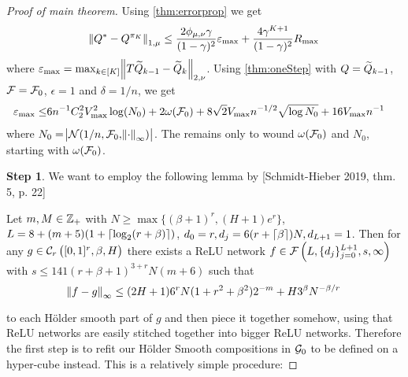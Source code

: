 




\begin{proof}[Proof of main theorem] %
  Using \cref{thm:errorprop} we get
  \begin{equation}
    \norm{Q^* - Q^{\pi_K}}_{1,\mu} \leq
    \frac{2 \phi_{\mu, \nu} \gamma}{(1-\gamma)^2}\varepsilon_{\max} +
    \frac{4 \gamma^{K+1}}{(1-\gamma)^2} R_{\max}
    \label{eq:mp1}
  \end{equation}
  where $\varepsilon_{\max} =
  \max_{k \in [K]} \norm{T \widetilde{Q}_{k-1} - \widetilde{Q}_k}_{2, \nu}$.
  Using \cref{thm:oneStep} with $Q = \widetilde{Q}_{k-1}$,
  $\mathcal{F} = \mathcal{F}_0$, $\epsilon = 1$ and $\delta = 1/n$, we get
  \begin{align}
    \varepsilon_{\max} \leq & 6 n^{-1} C_2^2 V_{\max}^2 \log(N_0)
    + 2 \omega(\mathcal{F}_0)
    + 8 \sqrt{2} V_{\max} n^{-1/2} \sqrt{\log N_0}
    + 16 V_{\max} n^{-1}
    \label{eq:mp2}
  \end{align}
  where $N_0 = \abs{\mathcal{N}(1/n, \mathcal{F}_0, \norm{\cdot}_\infty)}$.
  The remains only to wound $\omega(\mathcal{F}_0)$ and $N_0$,
  starting with $\omega(\mathcal{F}_0)$.

  \textbf{Step 1}. %
  We want to employ the following lemma by [Schmidt-Hieber 2019, thm. 5, p. 22]
  \begin{lem}
    Let $m,M \in \mathbb{Z}_+$ with $N \geq \max\{(\beta + 1)^r, (H + 1) e^r\}$,
    $L = 8 + (m + 5) (1 + \lceil\log_2(r + \beta)\rceil)$, 
    $d_0 = r, d_j = 6(r + \lceil\beta\rceil) N, d_{L+1} = 1$.
    Then for any $g \in \mathcal{C}_r \left( [0,1]^r, \beta, H \right)$
    there exists a ReLU network
    $f \in \mathcal{F}\left(L, \{d_j\}_{j=0}^{L+1}, s, \infty \right)$
    with $s \leq 141 (r + \beta + 1)^{3 + r} N (m+6)$
    such that
    \begin{equation*}
      \norm{f - g}_\infty \leq (2 H + 1) 6^r N (1 + r^2 + \beta^2) 2^{-m}
      + H 3^{\beta} N^{-\beta/r}
    \end{equation*}
    \label{lem:holderapprox} 
  \end{lem} 
  \vspace*{-\baselineskip}
  to each Hölder smooth part of $g$ and then piece it together somehow,
  using that ReLU networks are easily stitched together into bigger
  ReLU networks.
  Therefore the first step is to refit our
  Hölder Smooth compositions in $\mathcal{G}_0$ to be defined on a hyper-cube instead.
  This is a relatively simple procedure:


\end{proof}
